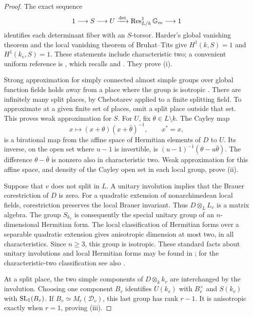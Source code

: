 \begin{proof}
The exact sequence
\[
 1\longrightarrow S\longrightarrow U
 \xrightarrow{\det}\operatorname{Res}^1_{L/k}\mathbb G_m\longrightarrow1
\]
identifies each determinant fiber with an $S$-torsor.  Harder's global
vanishing theorem and the local vanishing theorem of Bruhat--Tits give
$H^1(k,S)=1$ and $H^1(k_v,S)=1$.  These statements include characteristic
two; a convenient uniform reference is
\cite[Theorem~5.1.1(i)]{Conrad}, which recalls
\cite[Satz~A]{Harder} and \cite[Theorem~4.7(ii)]{BruhatTitsIII}.
They prove (i).

Strong approximation for simply connected almost simple groups over
global function fields holds away from a place where the group is
isotropic \cite[Theorem~A]{PrasadSA}.  There are infinitely many split
places, by Chebotarev applied to a finite splitting field.  To approximate
at a given finite set of places, omit a split place outside that set.
This proves weak approximation for $S$.
For $U$, fix $\theta\in L\setminus k$.  The Cayley map
\begin{equation}\label{arith:cayley}
 x\longmapsto (x+\theta)(x+\bar\theta)^{-1},\qquad x^*=x,
\end{equation}
is a birational map from the affine space of Hermitian elements of $D$
to $U$.  Its inverse, on the open set where $u-1$ is invertible, is
$(u-1)^{-1}(\theta-u\bar\theta)$.  The difference
$\theta-\bar\theta$ is nonzero also in characteristic two.  Weak
approximation for this affine space, and density of the Cayley open set
in each local group, prove (ii).

Suppose that $v$ does not split in $L$.  A unitary involution implies
that the Brauer corestriction of $D$ is zero.  For a quadratic extension
of nonarchimedean local fields, corestriction preserves the local Brauer
invariant.  Thus $D\otimes_L L_v$ is a matrix algebra.  The group $S_{k_v}$
is consequently the special unitary group of an $n$-dimensional Hermitian
form.  The local classification of Hermitian forms over a separable
quadratic extension gives anisotropic dimension at most two, in all
characteristics.  Since $n\geq3$, this group is isotropic.  These standard
facts about unitary involutions and local Hermitian forms may be found in
\cite{KMRT,Reiner}; for the characteristic-two classification see also
\cite[Theorem~3.3 and Corollary~3.4]{ElomaryTignol}.

At a split place, the two simple components of $D\otimes_k k_v$ are
interchanged by the involution.  Choosing one component $B_v$ identifies
$U(k_v)$ with $B_v^\times$ and $S(k_v)$ with $\operatorname{SL}_1(B_v)$.  If
$B_v\simeq M_r(\mathcal D_v)$, this last group has rank $r-1$.
It is anisotropic exactly when $r=1$, proving (iii).
\end{proof}

